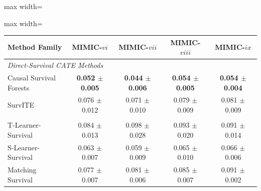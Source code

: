 \begin{table}[htbp]
{        \par\noindent\begin{adjustbox}{max width=\linewidth}\begin{minipage}[c]{\linewidth}
        \centering
        \begin{adjustbox}{max width=\linewidth}\begin{tabular}{lcccc}
        \toprule
        \textbf{Method Family} & \textbf{MIMIC-$vi$} & \textbf{MIMIC-$vii$} & \textbf{MIMIC-$viii$} & \textbf{MIMIC-$ix$} \\
        \midrule
        \multicolumn{5}{l}{\textit{Direct-Survival CATE Methods}} \\
                Causal Survival Forests & \textbf{0.052 $\pm$ 0.005} & \textbf{0.044 $\pm$ 0.006} & \textbf{0.054 $\pm$ 0.005} & \textbf{0.054 $\pm$ 0.004} \\ 
                SurvITE & 0.076 $\pm$ 0.012 & 0.071 $\pm$ 0.010 & 0.079 $\pm$ 0.009 & 0.081 $\pm$ 0.009 \\ 
        \addlinespace
        \multicolumn{5}{l}{\textit{Survival Meta-Learners}} \\
                T-Learner-Survival & 0.084 $\pm$ 0.013 & 0.098 $\pm$ 0.028 & 0.093 $\pm$ 0.020 & 0.091 $\pm$ 0.014 \\ 
                S-Learner-Survival & 0.063 $\pm$ 0.007 & 0.059 $\pm$ 0.009 & 0.065 $\pm$ 0.010 & 0.066 $\pm$ 0.006 \\ 
                Matching Survival & 0.077 $\pm$ 0.007 & 0.081 $\pm$ 0.006 & 0.085 $\pm$ 0.007 & 0.091 $\pm$ 0.002 \\ 
        \bottomrule
        \end{tabular}\end{adjustbox}
        \end{minipage}\end{adjustbox}\par
}
\end{table}